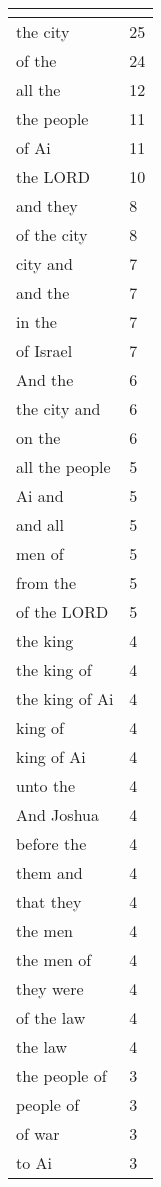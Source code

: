 \begin{center}
\begin{longtable}{|p{3.0in}|p{0.5in}|}
\hline \multicolumn{2}{c}{{ }} \\ \hline
\endfoot 
the city & 25\\ \hline 
of the & 24\\ \hline 
all the & 12\\ \hline 
the people & 11\\ \hline 
of Ai & 11\\ \hline 
the LORD & 10\\ \hline 
and they & 8\\ \hline 
of the city & 8\\ \hline 
city and & 7\\ \hline 
and the & 7\\ \hline 
in the & 7\\ \hline 
of Israel & 7\\ \hline 
And the & 6\\ \hline 
the city and & 6\\ \hline 
on the & 6\\ \hline 
all the people & 5\\ \hline 
Ai and & 5\\ \hline 
and all & 5\\ \hline 
men of & 5\\ \hline 
from the & 5\\ \hline 
of the LORD & 5\\ \hline 
the king & 4\\ \hline 
the king of & 4\\ \hline 
the king of Ai & 4\\ \hline 
king of & 4\\ \hline 
king of Ai & 4\\ \hline 
unto the & 4\\ \hline 
And Joshua & 4\\ \hline 
before the & 4\\ \hline 
them and & 4\\ \hline 
that they & 4\\ \hline 
the men & 4\\ \hline 
the men of & 4\\ \hline 
they were & 4\\ \hline 
of the law & 4\\ \hline 
the law & 4\\ \hline 
the people of & 3\\ \hline 
people of & 3\\ \hline 
of war & 3\\ \hline 
to Ai & 3\\ \hline 

\end{longtable}
\end{center}
